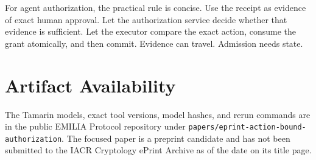 \documentclass[10.5pt]{article}
\newcommand{\code}[1]{\texttt{#1}}
\begin{document}
For agent authorization, the practical rule is concise. Use the receipt as
evidence of exact human approval. Let the authorization service decide whether
that evidence is sufficient. Let the executor compare the exact action, consume
the grant atomically, and then commit. Evidence can travel. Admission needs state.

\section*{Artifact Availability}

The Tamarin models, exact tool versions, model hashes, and rerun commands are in
the public EMILIA Protocol repository under
\code{papers/eprint-action-bound-authorization}. The focused paper is a preprint
candidate and has not been submitted to the IACR Cryptology ePrint Archive as of
the date on its title page.
\end{document}
